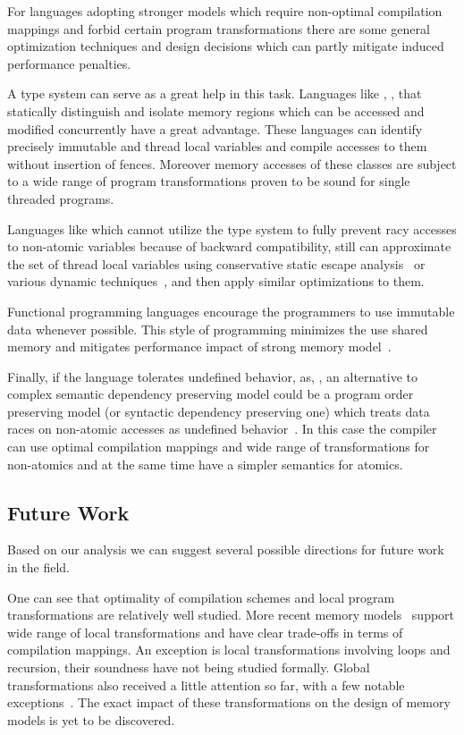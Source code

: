 For languages adopting stronger models which require non-optimal
compilation mappings and forbid certain program transformations
there are some general optimization techniques and design decisions
which can partly mitigate induced performance penalties.

A type system can serve as a great help in this task. 
Languages like \Haskell, \OCaml, \Rust that 
statically distinguish and isolate memory regions 
which can be accessed and modified concurrently have a great advantage.
These languages can identify precisely 
immutable and thread local variables
and compile accesses to them without insertion of fences.
Moreover memory accesses of these classes are subject to 
a wide range of program transformations proven to be
sound for single threaded programs. 
 
Languages like \Java which cannot utilize the type system 
to fully prevent racy accesses to non-atomic variables 
because of backward compatibility, still can 
approximate the set of thread local variables    
using conservative static escape analysis~\cite{Choi-al:OOPSLA1999}
or various dynamic techniques~\cite{Liu-al:PLDI19},
and then apply similar optimizations to them. 

Functional programming languages encourage 
the programmers to use immutable data whenever possible.
This style of programming minimizes the use 
shared memory and mitigates performance impact 
of strong memory model~\cite{Vollmer-al:PPoPP17}. 

Finally, if the language tolerates undefined behavior, as, \CPP, 
an alternative to complex semantic dependency preserving model
could be a program order preserving model (or syntactic dependency preserving one) 
which treats data races on non-atomic accesses as 
undefined behavior~\cite{Boehm-Demsky:MSPC14, Ou-Demsky:OOPSLA18}.
In this case the compiler can use optimal compilation mappings 
and wide range of transformations for non-atomics 
and at the same time have a simpler semantics for atomics. 

\subsection{Future Work}

Based on our analysis we can suggest several
possible directions for future work in the field. 

One can see that optimality of compilation schemes 
and local program transformations are relatively well studied.
More recent memory models~%
\cite{Lahav-al:PLDI17, Dolan-al:PLDI18, Kang-al:POPL17, Chakraborty-Vafeiadis:POPL19} 
support wide range of local transformations and have clear 
trade-offs in terms of compilation mappings. 
An exception is local transformations involving loops and recursion, 
their soundness have not being studied formally. 
Global transformations also received a little attention so far,
with a few notable exceptions~\cite{PichonPharabod-Sewell:POPL16, Lee-al:PLDI20}.
The exact impact of these transformations on the design of 
memory models is yet to be discovered. 


